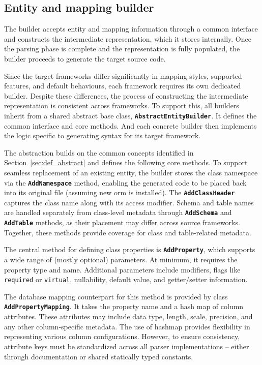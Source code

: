 \subsection{Entity and mapping builder}

The builder accepts entity and mapping information through a common interface and constructs the intermediate representation, which it stores internally. Once the parsing phase is complete and the representation is fully populated, the builder proceeds to generate the target source code.

Since the target frameworks differ significantly in mapping styles, supported features, and default behaviours, each framework requires its own dedicated builder. Despite these differences, the process of constructing the intermediate representation is consistent across frameworks. To support this, all builders inherit from a shared abstract base class, \texttt{\textbf{AbstractEntityBuilder}}. It defines the common interface and core methods. And each concrete builder then implements the logic specific to generating syntax for its target framework.

The abstraction builds on the common concepts identified in Section~\ref{sec:def_abstract} and defines the following core methods. To support seamless replacement of an existing entity, the builder stores the class namespace via the \texttt{\textbf{AddNamespace}} method, enabling the generated code to be placed back into its original file (assuming new \acrshort{orm} is installed). The \texttt{\textbf{AddClassHeader}} captures the class name along with its access modifier. 
Schema and table names are handled separately from class-level metadata through \texttt{\textbf{AddSchema}} and \texttt{\textbf{AddTable}} methods, as their placement may differ across source frameworks. Together, these methods provide coverage for class and table-related metadata. 

The central method for defining class properties is \texttt{\textbf{AddProperty}}, which supports a wide range of (mostly optional) parameters. At minimum, it requires the property type and name. Additional parameters include modifiers, flags like \texttt{required} or \texttt{virtual}, nullability, default value, and getter/setter information. 

The database mapping counterpart for this method is provided by class \texttt{\textbf{AddPropertyMapping}}. It takes the property name and a hash map of column attributes. These attributes may include data type, length, scale, precision, and any other column-specific metadata. The use of hashmap provides flexibility in representing various column configurations. However, to ensure consistency, attribute keys must be standardized across all parser implementations -- either through documentation or shared statically typed constants.

